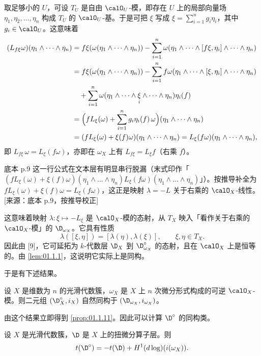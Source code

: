 取足够小的 $U$，可设 $T_U$ 是自由 $\calO_U$-模，即存在 $U$ 上的局部向量场 $\eta_1,\eta_2,\dots,\eta_n$ 构成 $T_U$ 的 $\calO_U$-基。于是可把 $\xi$ 写成 $\xi=\sum_{i=1}^n g_i\eta_i$，其中 $g_i\in\calO_U$。这意味着
\begin{align*}
(L_{f\xi}\omega)(\eta_1\wedge\dots\wedge\eta_n)&=f\xi(\omega(\eta_1\wedge\dots\wedge\eta_n))-\sum_{i=1}^n\omega(\eta_1\wedge\dots\wedge[f\xi,\eta_i]\wedge\dots\wedge\eta_n)\\
&=f\xi(\omega(\eta_1\wedge\dots\wedge\eta_n))-\sum_{i=1}^n f\omega(\eta_1\wedge\dots\wedge[\xi,\eta_i]\wedge\dots\wedge\eta_n)\\
&\quad+\sum_{i=1}^n\omega(\eta_1\wedge\dots\wedge\underset{i}{\xi}\wedge\dots\wedge\eta_n)\eta_i(f)\\
&=\Bigl(fL_\xi(\omega)+\sum_{i=1}^n g_i\eta_i(f)\,\omega\Bigr)(\eta_1\wedge\dots\wedge\eta_n)\\
&=(fL_\xi(\omega)+\xi(f)\omega)(\eta_1\wedge\dots\wedge\eta_n)=L_\xi(f\omega)(\eta_1\wedge\dots\wedge\eta_n),
\end{align*}
即 $L_{f\xi}\,\omega=L_\xi(f\omega)$，亦即在 $\omega_X$ 上有 $L_{f\xi}=L_\xi{}f$（右乘 $f$）。
\begin{annote}
底本 p.9 这一行公式在文本层有明显串行脱漏（末式印作「$(fL_\xi(\omega)+\xi(f)\omega)(\eta_1\wedge\dots\wedge\eta_n)L_\xi(f\omega)(\eta_1\wedge\dots\wedge\eta_n)$」）。按推导补全为 $fL_\xi(\omega)+\xi(f)\omega=L_\xi(f\omega)$，这正是映射 $\lambda=-L$ 关于右乘的 $\calO_X$-线性。[来源：底本 p.9，按推导校正]
\end{annote}
这意味着映射 $\lambda:\xi\mapsto-L_\xi$ 是 $\calO_X$-模的态射，从 $T_X$ 映入「看作关于右乘的 $\calO_X$-模」的 $\D_{\omega_X}$。它具有性质
$$\lambda([\xi,\eta])=[\lambda(\eta),\lambda(\xi)],\qquad \xi,\eta\in T_X.$$
因此由 [9]，它可延拓为 $k$-代数层 $\D_X$ 到 $\D_{\omega_X}^\circ$ 的态射，且在 $\calO_X$ 上是恒等的。由 \ref{lem:01.1.1}，这说明它实际上是同构。

于是有下述结果。

\begin{lemma}\label{lem:01.1.12}
设 $X$ 是维数为 $n$ 的光滑代数簇，$\omega_X$ 是 $X$ 上 $n$ 次微分形式构成的可逆 $\calO_X$-模。则二元组 $(\D_X^\circ,i_X)$ 自然同构于 $(\D_{\omega_X},i_{\omega_X})$。
\end{lemma}

由这个结果立即得到 \ref{prop:01.1.11}。因此可以计算 $\D^\circ$ 的同构类。

\begin{proposition}\label{prop:01.1.13}
设 $X$ 是光滑代数簇，$\D$ 是 $X$ 上的扭微分算子层。则
$$t(\D^\circ)=-t(\D)+H^1(d\log)(i(\omega_X)).$$
\end{proposition}

